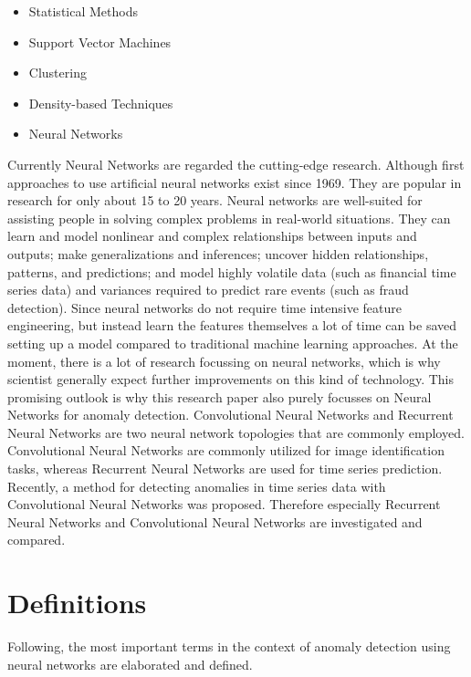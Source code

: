 \begin{itemize}
	\item Statistical Methods
	\item Support Vector Machines
	\item Clustering 
	\item Density-based Techniques
	\item Neural Networks 
\end{itemize}

Currently Neural Networks are regarded the cutting-edge research. Although first approaches to use artificial neural networks exist since 1969. They are popular in research for only about 15 to 20 years. Neural networks are well-suited for assisting people in solving complex problems in real-world situations. They can learn and model nonlinear and complex relationships between inputs and outputs; make generalizations and inferences; uncover hidden relationships, patterns, and predictions; and model highly volatile data (such as financial time series data) and variances required to predict rare events (such as fraud detection). Since neural networks do not require time intensive feature engineering, but instead learn the features themselves a lot of time can be saved setting up a model compared to traditional machine learning approaches. At the moment, there is a lot of research focussing on neural networks, which is why scientist generally expect further improvements on this kind of technology. This promising outlook is why this research paper also purely focusses on Neural Networks for anomaly detection. Convolutional Neural Networks and Recurrent Neural Networks are two neural network topologies that are commonly employed. Convolutional Neural Networks are commonly utilized for image identification tasks, whereas Recurrent Neural Networks are used for time series prediction. Recently, a method for detecting anomalies in time series data with Convolutional Neural Networks was proposed. Therefore especially Recurrent Neural Networks and Convolutional Neural Networks are investigated and compared.


\section{Definitions}
Following, the most important terms in the context of anomaly detection using neural networks are elaborated and defined. 

